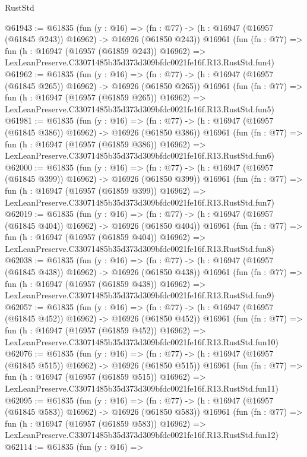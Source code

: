 \begin{lexlean}{RustStd}
\begin{coremodule}
@61943 := @61835
    (fun (y : @16) =>
    (fn : @77) -> (h : @16947 (@16957 (@61845 @243)) @16962) -> @16926 (@61850 @243))
    @16961
    (fun (fn : @77) =>
    fun (h : @16947 (@16957 (@61859 @243)) @16962) =>
    LexLeanPreserve.C33071485b35d373d309bfdc0021fe16f.R13.RustStd.fun4)
@61962 := @61835
    (fun (y : @16) =>
    (fn : @77) -> (h : @16947 (@16957 (@61845 @265)) @16962) -> @16926 (@61850 @265))
    @16961
    (fun (fn : @77) =>
    fun (h : @16947 (@16957 (@61859 @265)) @16962) =>
    LexLeanPreserve.C33071485b35d373d309bfdc0021fe16f.R13.RustStd.fun5)
@61981 := @61835
    (fun (y : @16) =>
    (fn : @77) -> (h : @16947 (@16957 (@61845 @386)) @16962) -> @16926 (@61850 @386))
    @16961
    (fun (fn : @77) =>
    fun (h : @16947 (@16957 (@61859 @386)) @16962) =>
    LexLeanPreserve.C33071485b35d373d309bfdc0021fe16f.R13.RustStd.fun6)
@62000 := @61835
    (fun (y : @16) =>
    (fn : @77) -> (h : @16947 (@16957 (@61845 @399)) @16962) -> @16926 (@61850 @399))
    @16961
    (fun (fn : @77) =>
    fun (h : @16947 (@16957 (@61859 @399)) @16962) =>
    LexLeanPreserve.C33071485b35d373d309bfdc0021fe16f.R13.RustStd.fun7)
@62019 := @61835
    (fun (y : @16) =>
    (fn : @77) -> (h : @16947 (@16957 (@61845 @404)) @16962) -> @16926 (@61850 @404))
    @16961
    (fun (fn : @77) =>
    fun (h : @16947 (@16957 (@61859 @404)) @16962) =>
    LexLeanPreserve.C33071485b35d373d309bfdc0021fe16f.R13.RustStd.fun8)
@62038 := @61835
    (fun (y : @16) =>
    (fn : @77) -> (h : @16947 (@16957 (@61845 @438)) @16962) -> @16926 (@61850 @438))
    @16961
    (fun (fn : @77) =>
    fun (h : @16947 (@16957 (@61859 @438)) @16962) =>
    LexLeanPreserve.C33071485b35d373d309bfdc0021fe16f.R13.RustStd.fun9)
@62057 := @61835
    (fun (y : @16) =>
    (fn : @77) -> (h : @16947 (@16957 (@61845 @452)) @16962) -> @16926 (@61850 @452))
    @16961
    (fun (fn : @77) =>
    fun (h : @16947 (@16957 (@61859 @452)) @16962) =>
    LexLeanPreserve.C33071485b35d373d309bfdc0021fe16f.R13.RustStd.fun10)
@62076 := @61835
    (fun (y : @16) =>
    (fn : @77) -> (h : @16947 (@16957 (@61845 @515)) @16962) -> @16926 (@61850 @515))
    @16961
    (fun (fn : @77) =>
    fun (h : @16947 (@16957 (@61859 @515)) @16962) =>
    LexLeanPreserve.C33071485b35d373d309bfdc0021fe16f.R13.RustStd.fun11)
@62095 := @61835
    (fun (y : @16) =>
    (fn : @77) -> (h : @16947 (@16957 (@61845 @583)) @16962) -> @16926 (@61850 @583))
    @16961
    (fun (fn : @77) =>
    fun (h : @16947 (@16957 (@61859 @583)) @16962) =>
    LexLeanPreserve.C33071485b35d373d309bfdc0021fe16f.R13.RustStd.fun12)
@62114 := @61835
    (fun (y : @16) =>

\end{coremodule}
\end{lexlean}

